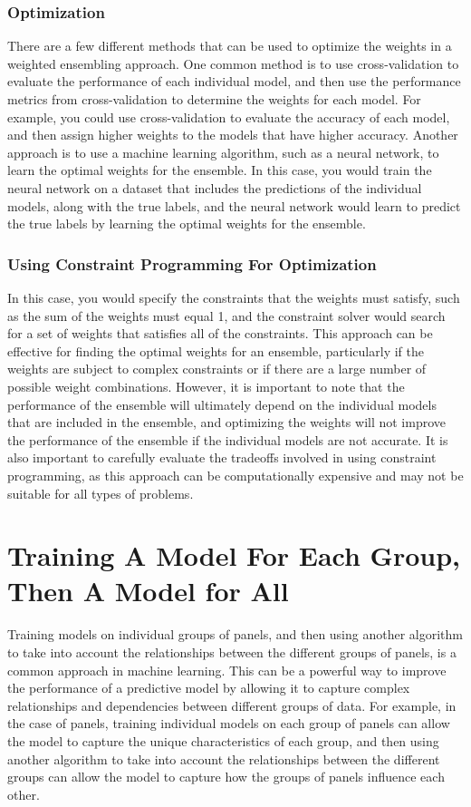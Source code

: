 \documentclass{report}
\begin{document}
\subsubsection{Optimization}
There are a few different methods that can be used to optimize the weights in a weighted ensembling approach. One common method is to use cross-validation to evaluate the performance of each individual model, and then use the performance metrics from cross-validation to determine the weights for each model. For example, you could use cross-validation to evaluate the accuracy of each model, and then assign higher weights to the models that have higher accuracy. Another approach is to use a machine learning algorithm, such as a neural network, to learn the optimal weights for the ensemble. In this case, you would train the neural network on a dataset that includes the predictions of the individual models, along with the true labels, and the neural network would learn to predict the true labels by learning the optimal weights for the ensemble.
\subsubsection{Using Constraint Programming For Optimization}
In this case, you would specify the constraints that the weights must satisfy, such as the sum of the weights must equal 1, and the constraint solver would search for a set of weights that satisfies all of the constraints. This approach can be effective for finding the optimal weights for an ensemble, particularly if the weights are subject to complex constraints or if there are a large number of possible weight combinations. However, it is important to note that the performance of the ensemble will ultimately depend on the individual models that are included in the ensemble, and optimizing the weights will not improve the performance of the ensemble if the individual models are not accurate. It is also important to carefully evaluate the tradeoffs involved in using constraint programming, as this approach can be computationally expensive and may not be suitable for all types of problems.
\section{Training A Model For Each Group, Then A Model for All}
Training models on individual groups of panels, and then using another algorithm to take into account the relationships between the different groups of panels, is a common approach in machine learning. This can be a powerful way to improve the performance of a predictive model by allowing it to capture complex relationships and dependencies between different groups of data. For example, in the case of panels, training individual models on each group of panels can allow the model to capture the unique characteristics of each group, and then using another algorithm to take into account the relationships between the different groups can allow the model to capture how the groups of panels influence each other.
\end{document}
